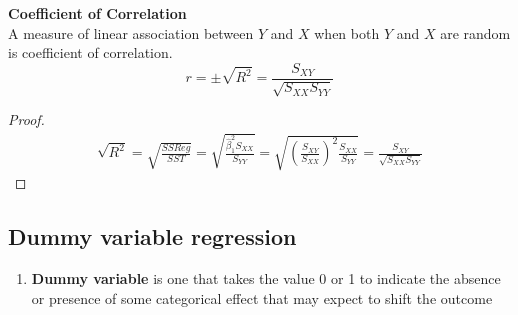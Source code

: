 \documentclass[11pt]{article}
\begin{document}
\begin{defn*}
	\textbf{Coefficient of Correlation}\\ 
	A measure of linear association between $Y$ and $X$ when both $Y$ and $X$ are random is coefficient of correlation. 
	\[
		r = \pm \sqrt{R^2} = \frac{S_{XY}}{\sqrt{S_{XX}S_{YY}}}
	\]
	\begin{proof}
		\begin{align*}
			\sqrt{R^2} 
			= \sqrt{\frac{SSReg}{SST}} 
			= \sqrt{\frac{\hat{\beta}_1^2 S_{XX}}{S_{YY}}}
			= \sqrt{(\frac{S_{XY}}{S_{XX}})^2 \frac{ S_{XX}}{S_{YY}}}
			= \frac{S_{XY}}{\sqrt{S_{XX}S_{YY}}}
		\end{align*}
	\end{proof}
\end{defn*}


\subsection*{Dummy variable regression}


\begin{defn*}
	\begin{enumerate}
		\item \textbf{Dummy variable} is one that takes the value 0 or 1 to indicate the absence or presence of some categorical effect that may expect to shift the outcome
	\end{enumerate}
\end{defn*}
\end{document}
